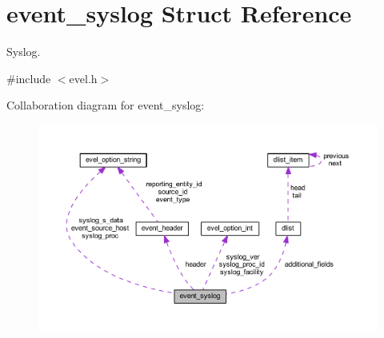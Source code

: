 \hypertarget{structevent__syslog}{}\section{event\+\_\+syslog Struct Reference}
\label{structevent__syslog}


Syslog.  




{\ttfamily \#include $<$evel.\+h$>$}



Collaboration diagram for event\+\_\+syslog\+:
\nopagebreak
\begin{figure}[H]
\begin{center}
\leavevmode
\includegraphics[width=350pt]{structevent__syslog__coll__graph}
\end{center}
\end{figure}
